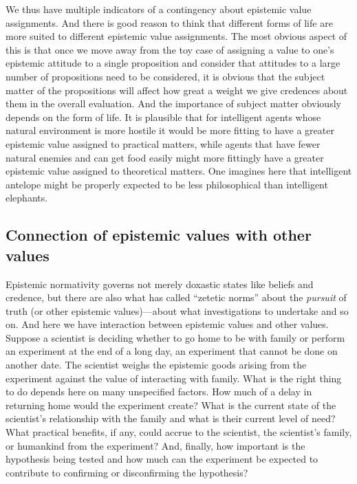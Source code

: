 We thus have multiple indicators of a contingency about epistemic value assignments. And there is good reason to think
that different forms of life are more suited to different epistemic value assignments. The most obvious aspect of this
is that once we move away from the toy case of assigning a value to one's epistemic attitude to a single proposition
and consider that attitudes to a large number of propositions need to be considered, it is obvious that the subject
matter of the propositions will affect how great a weight we give credences about them in the overall evaluation. And
the importance of subject matter obviously depends on the form of life. It is plausible that for intelligent agents whose
natural environment is more hostile it would be more fitting to have a greater epistemic 
value assigned to practical matters, while agents that have fewer natural enemies and can get food easily might more fittingly
have a greater epistemic value assigned to theoretical matters. One imagines here that intelligent antelope might be
properly expected to be less philosophical than intelligent elephants.


\subsection{Connection of epistemic values with other values}
Epistemic normativity governs not merely doxastic states like beliefs and credence, but there are also what
 has called ``zetetic norms'' about the \textit{pursuit} of truth (or other epistemic
values)---about what investigations
to undertake and so on. And here we have interaction between epistemic values and other values.
Suppose a scientist is deciding whether to go home to be with family or perform an experiment at the end of a long day, an experiment that 
cannot be done on another date. 
The scientist weighs the epistemic goods arising from the experiment against the value of interacting
with family. What is the right thing to do depends here on many unspecified factors. How much of a delay
in returning home would the experiment create? What is the current state of the scientist's relationship 
with the family and what is their current level of need? What
practical benefits, if any, could accrue to the scientist, the scientist's family, or humankind from the
experiment? And, finally, how important is the hypothesis being tested and 
how much can the experiment be expected to contribute to confirming or disconfirming the hypothesis? 


